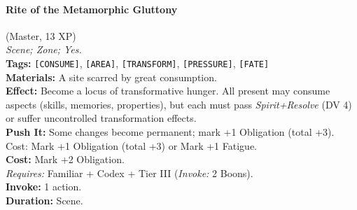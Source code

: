 \paragraph{Rite of the Metamorphic Gluttony} (Master, 13 XP) \hfill \\
\emph{Scene; Zone; Yes.} \\
\textbf{Tags:} \texttt{[CONSUME]}, \texttt{[AREA]}, \texttt{[TRANSFORM]}, \texttt{[PRESSURE]}, \texttt{[FATE]} \\
\textbf{Materials:} A site scarred by great consumption. \\
\textbf{Effect:} Become a locus of transformative hunger. All present may consume aspects (skills, memories, properties), but each must pass \textit{Spirit+Resolve} (DV 4) or suffer uncontrolled transformation effects. \\
\textbf{Push It:} Some changes become permanent; mark +1 Obligation (total +3). Cost: Mark +1 Obligation (total +3) or Mark +1 Fatigue. \\
\textbf{Cost:} Mark +2 Obligation. \\
\textit{Requires:} Familiar + Codex + Tier III (\textit{Invoke:} 2 Boons). \\
\textbf{Invoke:} 1 action. \\
\textbf{Duration:} Scene.

